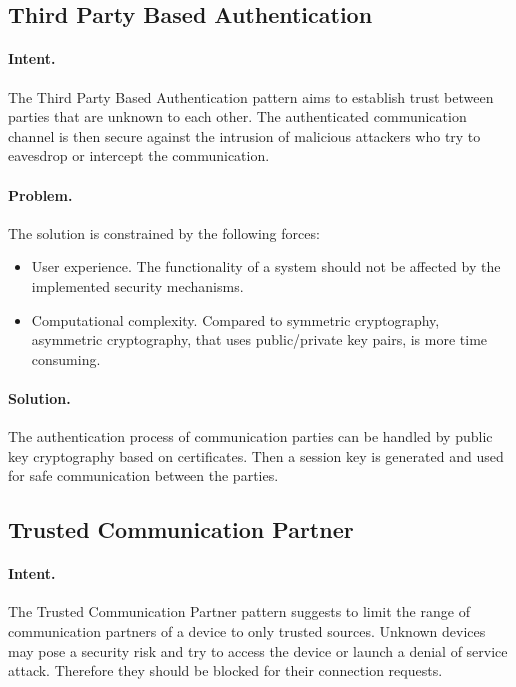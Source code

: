 \subsection{Third Party Based Authentication~\cite{Sinnhofer2016}}
\label{p:auc}

\paragraph{\textbf{Intent.}} The Third Party Based Authentication pattern aims to establish trust between parties that are unknown to each other. The authenticated communication channel is then secure against the intrusion of malicious attackers who try to eavesdrop or intercept the communication.


\paragraph{\textbf{Problem.}} The solution is constrained by the following forces:
\begin{itemize}
	\item User experience. The functionality of a system should not be affected by the implemented security mechanisms. 
	\item Computational complexity. Compared to symmetric cryptography, asymmetric cryptography, that uses public/private key pairs, is more time consuming.
\end{itemize}

\paragraph{\textbf{Solution.}} The authentication process of communication parties can be handled by public key cryptography based on certificates. Then a session key is generated and used for safe communication between the parties.


\subsection{Trusted Communication Partner~\cite{Reinfurt20172}}
\label{p:partner} 

\paragraph{\textbf{Intent.}} The Trusted Communication Partner pattern suggests to limit the range of communication partners of a device to only trusted sources. Unknown devices may pose a security risk and try to access the device or launch a denial of service attack. Therefore they should be blocked for their connection requests.

